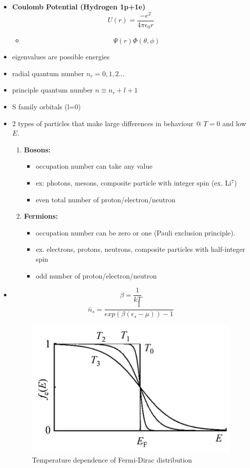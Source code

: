 \begin{itemize}
    \item \textbf{Coulomb Potential (Hydrogen 1p+1e)}
    \[ U(r) = \frac{-e^2}{4\pi \epsilon_0 r}\]
    \begin{itemize}
        \item \[\Psi(r)\Phi(\theta,\phi)\]
    \end{itemize}
    \item eigenvalues are possible energies
    \item radial quantum number $n_r = 0,1,2...$
    \item principle quantum number $n \equiv n_r + l + 1$
    \item S family orbitals (l=0)
    \item 2 types of particles that make large differences in behaviour @ $T=0$ and low $E$.
    \begin{enumerate}
        \item \textbf{Bosons:}
        \begin{itemize}
            \item occupation number can take any value 
            \item ex: photons, mesons, composite particle with integer spin (ex. Li$^7$)
            \item even total number of proton/electron/neutron
        \end{itemize}
        \item \textbf{Fermions:}
        \begin{itemize}
            \item occupation number can be zero or one (Pauli exclusion principle).
            \item ex. electrons, protons, neutrons, composite particles with half-integer spin
            \item odd number of proton/electron/neutron
        \end{itemize}
    \end{enumerate}
    \item  
    \[\beta = \frac{1}{kT}\]
    \[\bar{n}_s = \frac{1}{exp(\beta(\epsilon_s-\mu))-1}\]
    \begin{figure}
        \centering
        \includegraphics[width=0.5\linewidth]{Images/Fermi-Dirac-distribution.png}
        \caption{Temperature dependence of Fermi-Dirac distribution}
        \label{fig:Fermi-Dirac}
    \end{figure}
\end{itemize}
